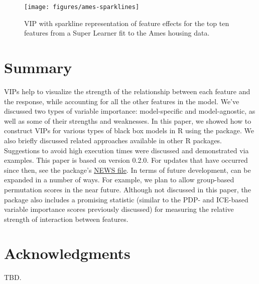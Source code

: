\begin{figure}[!htb]
  \centering 
  \texttt{[image: figures/ames-sparklines]} 
  \caption{VIP with sparkline representation of feature effects for the top ten features from a Super Learner fit to the Ames housing data.}
  \label{fig:sparklines}
\end{figure}


\section{Summary}

VIPs help to visualize the strength of the relationship between each feature and the response, while accounting for all the other features in the model. We've discussed two types of variable importance: model-specific and model-agnostic, as well as some of their strengths and weaknesses. In this paper, we showed how
to construct VIPs for various types of black box models in R using the  package. We also briefly
discussed related approaches available in other R packages. Suggestions to avoid
high execution times were discussed and demonstrated via examples. This paper is based on  version 0.2.0. For updates that have occurred since then, see the package’s \href{https://cran.r-project.org/web/packages/vip/news/news.html}{NEWS file}. In terms of future development,  can be expanded in a number of ways. For
example, we plan to allow group-based permutation scores in the near future. Although not discussed in this paper, the package also includes a promising statistic (similar to the PDP- and ICE-based variable importance scores previously discussed) for measuring the relative strength of interaction between features. 


\section{Acknowledgments}

TBD.




\address{Brandon M. Greenwell\\
  Department of Mathematics and Statistics\\
  Wright State University\\
  3640 Colonel Glenn Hwy\\ 
  Dayton, OH 45435\\
  United States of America\\
  ORCiD: \href{https://orcid.org/0000-0002-8120-0084}{0000-0002-8120-0084}\\
  }

\address{Bradley C. Boehmke\\
  University of Cincinnati\\
  2925 Campus Green Dr\\
  Cincinnati, OH 45221\\
  United States of America\\
  ORCiD: \href{https://orcid.org/0000-0002-3611-8516}{0000-0002-3611-8516}\\
  }
